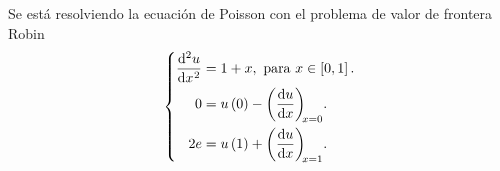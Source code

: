 \begin{solution}
      Se está resolviendo la ecuación de Poisson con el
      problema de valor de frontera Robin
      \begin{equation*}
            \left\{
            \begin{aligned}
                  \diff[2]{u}{x}
                   & =1+x,
                  \text{ para }x\in\left[0,1\right].     \\
                  0
                   & = u\left(0\right)-\diff{u}{x}[x=0]. \\
                  2e
                   & =u\left(1\right)+\diff{u}{x}[x=1].  \\
            \end{aligned}
            \right.
      \end{equation*}


\end{solution}
